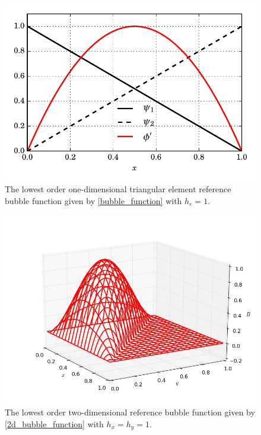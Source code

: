 
\begin{figure}
  \centering
    \includegraphics[width=\linewidth]{images/bubbles/bubble_new.pdf}
  \caption[One-dimensional bubble function]{The lowest order one-dimensional triangular element reference bubble function given by \cref{bubble_function} with $h_e = 1$.}
  \label{1d_bubble_image}
\end{figure}


\begin{figure}
  \centering
    \includegraphics[width=\linewidth]{images/bubbles/2d_bubble.png}
  \caption[Two-dimensional bubble function]{The lowest order two-dimensional reference bubble function given by \cref{2d_bubble_function} with $h_x = h_y = 1$.}
  \label{2d_bubble_image}
\end{figure}




